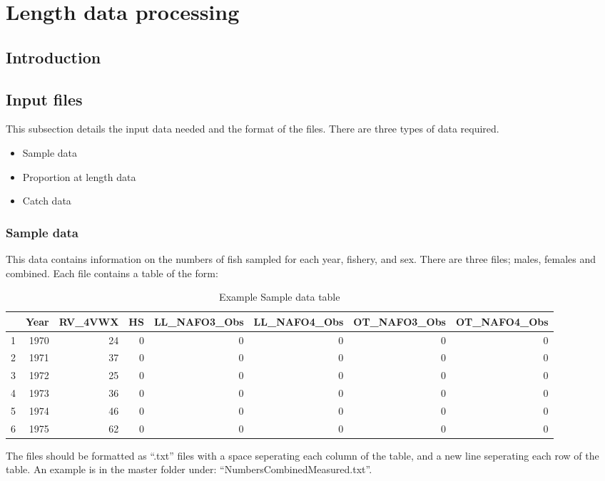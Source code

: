 \documentclass[12pt,a4paper]{article}
\begin{document}


\section{Length data processing}

\subsection{Introduction}

\subsection{Input files}

This subsection details the input data needed and the format of the files. There are three types of data required. 

\begin{itemize}
\item Sample data
\item Proportion at length data
\item Catch data
\end{itemize}

\subsubsection{Sample data}

This data contains information on the numbers of fish sampled for each year, fishery, and sex. There are three files; males, females and combined. Each file contains a table of the form:

\begin{table}[ht]
\centering
{\tiny
\begin{tabular}{rrrrrrrr}
  \hline
 & Year & RV\_4VWX & HS & LL\_NAFO3\_Obs & LL\_NAFO4\_Obs & OT\_NAFO3\_Obs & OT\_NAFO4\_Obs \\ 
  \hline
1 & 1970 &  24 &   0 &   0 &   0 &   0 &   0 \\ 
  2 & 1971 &  37 &   0 &   0 &   0 &   0 &   0 \\ 
  3 & 1972 &  25 &   0 &   0 &   0 &   0 &   0 \\ 
  4 & 1973 &  36 &   0 &   0 &   0 &   0 &   0 \\ 
  5 & 1974 &  46 &   0 &   0 &   0 &   0 &   0 \\ 
  6 & 1975 &  62 &   0 &   0 &   0 &   0 &   0 \\ 
   \hline
\end{tabular}
}
\caption{Example Sample data table} 
\end{table}
The files should be formatted as ``.txt'' files with a space seperating each column of the table, and a new line seperating each row of the table. An example is in the master folder under: ``NumbersCombinedMeasured.txt''.
\end{document}

